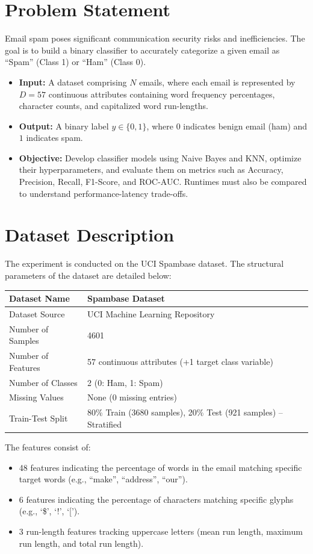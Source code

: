 \documentclass[12pt,a4paper]{article}
\begin{document}
\section{Problem Statement}
Email spam poses significant communication security risks and inefficiencies. The goal is to build a binary classifier to accurately categorize a given email as ``Spam'' (Class 1) or ``Ham'' (Class 0).
\begin{itemize}
    \item \textbf{Input:} A dataset comprising $N$ emails, where each email is represented by $D = 57$ continuous attributes containing word frequency percentages, character counts, and capitalized word run-lengths.
    \item \textbf{Output:} A binary label $y \in \{0, 1\}$, where $0$ indicates benign email (ham) and $1$ indicates spam.
    \item \textbf{Objective:} Develop classifier models using Naive Bayes and KNN, optimize their hyperparameters, and evaluate them on metrics such as Accuracy, Precision, Recall, F1-Score, and ROC-AUC. Runtimes must also be compared to understand performance-latency trade-offs.
\end{itemize}

\section{Dataset Description}
The experiment is conducted on the UCI Spambase dataset. The structural parameters of the dataset are detailed below:

\begin{longtable}{|p{6cm}|p{8cm}|}
\hline
Dataset Name & Spambase Dataset \\ \hline
Dataset Source & UCI Machine Learning Repository \\ \hline
Number of Samples & 4601 \\ \hline
Number of Features & 57 continuous attributes (+1 target class variable) \\ \hline
Number of Classes & 2 (0: Ham, 1: Spam) \\ \hline
Missing Values & None (0 missing entries) \\ \hline
Train-Test Split & 80\% Train (3680 samples), 20\% Test (921 samples) -- Stratified \\ \hline
\end{longtable}

The features consist of:
\begin{itemize}
    \item 48 features indicating the percentage of words in the email matching specific target words (e.g., ``make'', ``address'', ``our'').
    \item 6 features indicating the percentage of characters matching specific glyphs (e.g., `\$', `!', `[').
    \item 3 run-length features tracking uppercase letters (mean run length, maximum run length, and total run length).
\end{itemize}
\end{document}
